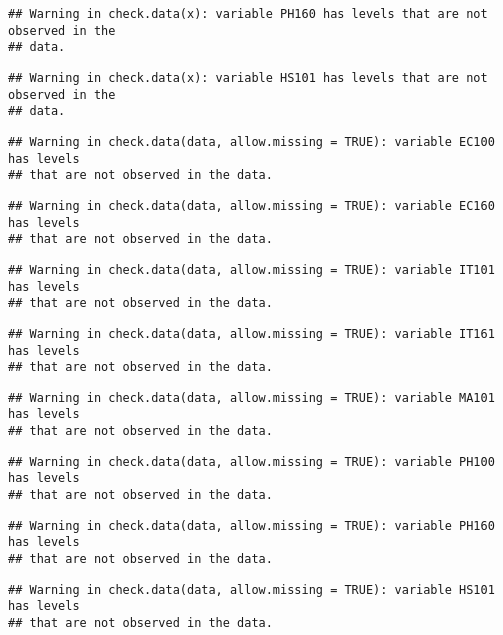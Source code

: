 \documentclass[
]{article}
\begin{document}
\begin{verbatim}
## Warning in check.data(x): variable PH160 has levels that are not observed in the
## data.
\end{verbatim}

\begin{verbatim}
## Warning in check.data(x): variable HS101 has levels that are not observed in the
## data.
\end{verbatim}

\begin{verbatim}
## Warning in check.data(data, allow.missing = TRUE): variable EC100 has levels
## that are not observed in the data.
\end{verbatim}

\begin{verbatim}
## Warning in check.data(data, allow.missing = TRUE): variable EC160 has levels
## that are not observed in the data.
\end{verbatim}

\begin{verbatim}
## Warning in check.data(data, allow.missing = TRUE): variable IT101 has levels
## that are not observed in the data.
\end{verbatim}

\begin{verbatim}
## Warning in check.data(data, allow.missing = TRUE): variable IT161 has levels
## that are not observed in the data.
\end{verbatim}

\begin{verbatim}
## Warning in check.data(data, allow.missing = TRUE): variable MA101 has levels
## that are not observed in the data.
\end{verbatim}

\begin{verbatim}
## Warning in check.data(data, allow.missing = TRUE): variable PH100 has levels
## that are not observed in the data.
\end{verbatim}

\begin{verbatim}
## Warning in check.data(data, allow.missing = TRUE): variable PH160 has levels
## that are not observed in the data.
\end{verbatim}

\begin{verbatim}
## Warning in check.data(data, allow.missing = TRUE): variable HS101 has levels
## that are not observed in the data.
\end{verbatim}
\end{document}
